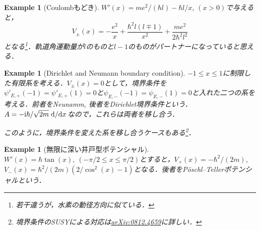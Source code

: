 \documentclass[english, dvipdfmx, a4paper]{jsarticle}
\theoremstyle{break}
\newtheorem{eg}[thm]{Example}
\renewcommand{\i}{\mathrm{i}}
\begin{document}
	\begin{eg}[Coulombもどき]
		$W'(x) = me^2/(\hbar l) - \hbar l/x$, $(x>0)$で与えると，
		\begin{equation}
			V_{\pm}(x) = -\frac{e^2}{x} + \frac{\hbar^2l(l\mp1)}{x^2} + \frac{me^2}{2\hbar^2l^2}
		\end{equation}
		となる\footnote{若干違うが，水素の動径方向に似ている．}．軌道角運動量が$l$のものと$l-1$のものがパートナーになっていると思える．
	\end{eg}

	\begin{eg}[Dirichlet and Neumann boundary condition]
		$-1 \leq x \leq 1$に制限した有限系を考える．$V_{\pm}(x) = 0$として，境界条件を$\psi'_{E, +}(-1) = \psi'_{E, +}(1) = 0$と$\psi_{E, -}(-1) = \psi_{E, -}(1) = 0$と入れた二つの系を考える．前者をNeunamm, 後者をDirichlet境界条件という．
		$A = -\i\hbar/\sqrt{2m}\dv*{}{x}$なので，これらは両者を移し合う．

		このように，境界条件を変えた系を移し合うケースもある\footnote{境界条件のSUSYによる対応は\href{https://arxiv.org/abs/0812.4659}{arXiv:0812.4659}に詳しい．}．
	\end{eg}

	\begin{eg}[無限に深い井戸型ポテンシャル]
		$W'(x) = \hbar\tan(x), \ (-\pi/2\leq x\leq \pi/2)$とすると，$V_+(x) = -\hbar^{2}/(2m)$, $V_-(x) = \hbar^2/(2m)(2/\cos^2(x) - 1)$となる．後者をP\"{o}schl--Tellerポテンシャルという．
	\end{eg}
	
\end{document}
